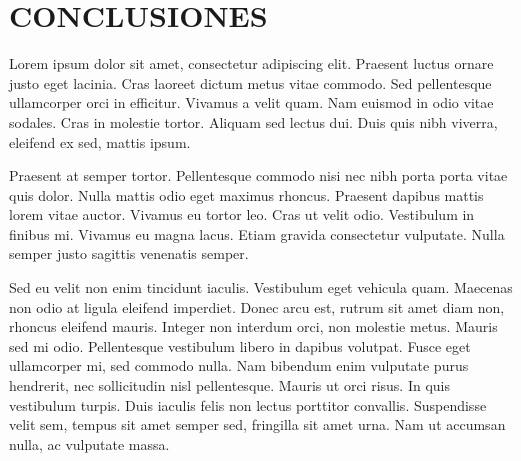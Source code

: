 
\chapter{CONCLUSIONES}


Lorem ipsum dolor sit amet, consectetur adipiscing elit. Praesent luctus ornare justo eget lacinia. Cras laoreet dictum metus vitae commodo. Sed pellentesque ullamcorper orci in efficitur. Vivamus a velit quam. Nam euismod in odio vitae sodales. Cras in molestie tortor. Aliquam sed lectus dui. Duis quis nibh viverra, eleifend ex sed, mattis ipsum.

Praesent at semper tortor. Pellentesque commodo nisi nec nibh porta porta vitae quis dolor. Nulla mattis odio eget maximus rhoncus. Praesent dapibus mattis lorem vitae auctor. Vivamus eu tortor leo. Cras ut velit odio. Vestibulum in finibus mi. Vivamus eu magna lacus. Etiam gravida consectetur vulputate. Nulla semper justo sagittis venenatis semper.

Sed eu velit non enim tincidunt iaculis. Vestibulum eget vehicula quam. Maecenas non odio at ligula eleifend imperdiet. Donec arcu est, rutrum sit amet diam non, rhoncus eleifend mauris. Integer non interdum orci, non molestie metus. Mauris sed mi odio. Pellentesque vestibulum libero in dapibus volutpat. Fusce eget ullamcorper mi, sed commodo nulla. Nam bibendum enim vulputate purus hendrerit, nec sollicitudin nisl pellentesque. Mauris ut orci risus. In quis vestibulum turpis. Duis iaculis felis non lectus porttitor convallis. Suspendisse velit sem, tempus sit amet semper sed, fringilla sit amet urna. Nam ut accumsan nulla, ac vulputate massa.